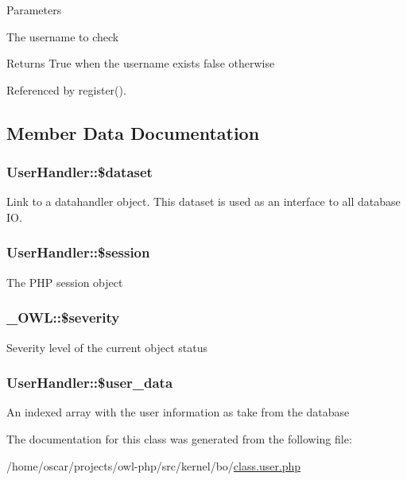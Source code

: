 \begin{DoxyParams}{Parameters}
\item[\mbox{\tt[in]} {\em \$username}]The username to check \end{DoxyParams}
\begin{DoxyReturn}{Returns}
True when the username exists false otherwise 
\end{DoxyReturn}


Referenced by register().



\subsection{Member Data Documentation}
\subsubsection[{\$dataset}]{\setlength{\rightskip}{0pt plus 5cm}UserHandler::\$dataset}\label{classUserHandler_ac38c1ea50b2820ed03781bdbe8eb2e08}
Link to a datahandler object. This dataset is used as an interface to all database IO. 
\subsubsection[{\$session}]{\setlength{\rightskip}{0pt plus 5cm}UserHandler::\$session}\label{classUserHandler_af097b7fd1ee085b46a6c34e071508a7f}
The PHP session object 
\subsubsection[{\$severity}]{\setlength{\rightskip}{0pt plus 5cm}\_\-OWL::\$severity}\label{class__OWL_ad26b40a9dbbacb33e299b17826f8327c}
Severity level of the current object status 
\subsubsection[{\$user\_\-data}]{\setlength{\rightskip}{0pt plus 5cm}UserHandler::\$user\_\-data}\label{classUserHandler_ae7a2d59eee65560ac96b860e828bb445}
An indexed array with the user information as take from the database 

The documentation for this class was generated from the following file:\begin{DoxyCompactItemize}
\item 
/home/oscar/projects/owl-\/php/src/kernel/bo/\hyperlink{class_8user_8php}{class.user.php}\end{DoxyCompactItemize}
